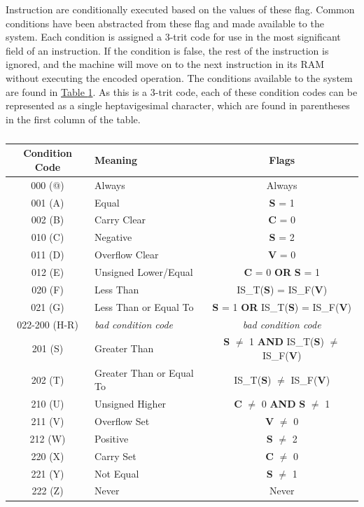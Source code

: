 \documentclass[12pt]{article}
\begin{document}
Instruction are conditionally executed based on the values of these flag. Common conditions have been
abstracted from these flag and made available to the system. Each condition is assigned a 3-trit code
for use in the most significant field of an instruction. If the condition is false, the rest of the
instruction is ignored, and the machine will move on to the next instruction in its RAM without executing
the encoded operation. The conditions available to the system are found in
\hyperref[tab:Conditions]{Table \ref{tab:Conditions}}. As this is a 3-trit code, each of these condition
codes can be represented as a single heptavigesimal character, which are found in parentheses in the
first column of the table.

\begin{table}[h!]
    \centering
    \caption{}
    \label{tab:Conditions}
    \begin{tabular}{|c|l|c|} 
        \hline
        \textbf{Condition Code} & Meaning & Flags \\ \hline
        
        000 (@) & Always & Always \\ \hline
        001 (A) & Equal & \textbf{S} = 1 \\ \hline
        002 (B) & Carry Clear & \textbf{C} = 0 \\ \hline
        010 (C) & Negative & \textbf{S} = 2 \\ \hline
        011 (D) & Overflow Clear & \textbf{V} = 0 \\ \hline
        012 (E) & Unsigned Lower/Equal & \textbf{C} = 0 \textbf{OR} \textbf{S} = 1 \\ \hline
        020 (F) & Less Than & IS\_T(\textbf{S}) = IS\_F(\textbf{V}) \\ \hline
        021 (G) & Less Than or Equal To & \textbf{S} = 1 \textbf{OR} IS\_T(\textbf{S}) = IS\_F(\textbf{V}) \\ \hline
    
        022-200 (H-R) & \textit{bad condition code} & \textit{bad condition code} \\ \hline
    
        201 (S) & Greater Than & \textbf{S} $\neq$ 1 \textbf{AND} IS\_T(\textbf{S}) $\neq$ IS\_F(\textbf{V}) \\ \hline
        202 (T) & Greater Than or Equal To & IS\_T(\textbf{S}) $\neq$ IS\_F(\textbf{V}) \\ \hline
        210 (U) & Unsigned Higher & \textbf{C} $\neq$ 0 \textbf{AND} \textbf{S} $\neq$ 1 \\ \hline
        211 (V) & Overflow Set & \textbf{V} $\neq$ 0 \\ \hline
        212 (W) & Positive & \textbf{S} $\neq$ 2 \\ \hline
        220 (X) & Carry Set & \textbf{C} $\neq$ 0 \\ \hline
        221 (Y) & Not Equal & \textbf{S} $\neq$ 1 \\ \hline
        222 (Z) & Never & Never \\ \hline
    \end{tabular}
\end{table}
\end{document}
